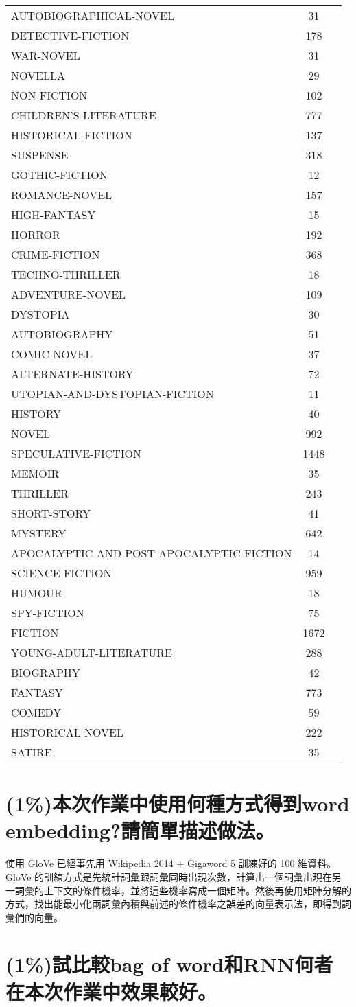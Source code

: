 \documentclass[fleqn,a4paper,12pt]{article}
\begin{document}
\begin{tabular}{| l | c | r |}
  AUTOBIOGRAPHICAL-NOVEL & 31 \\
  DETECTIVE-FICTION & 178 \\
  WAR-NOVEL & 31 \\
  NOVELLA & 29 \\
  NON-FICTION & 102 \\
  CHILDREN'S-LITERATURE & 777 \\
  HISTORICAL-FICTION & 137 \\
  SUSPENSE & 318 \\
  GOTHIC-FICTION & 12 \\
  ROMANCE-NOVEL & 157 \\
  HIGH-FANTASY & 15 \\
  HORROR & 192 \\
  CRIME-FICTION & 368 \\
  TECHNO-THRILLER & 18 \\
  ADVENTURE-NOVEL & 109 \\
  DYSTOPIA & 30 \\
  AUTOBIOGRAPHY & 51 \\
  COMIC-NOVEL & 37 \\
  ALTERNATE-HISTORY & 72 \\
  UTOPIAN-AND-DYSTOPIAN-FICTION & 11 \\
  HISTORY & 40 \\
  NOVEL & 992 \\
  SPECULATIVE-FICTION & 1448 \\
  MEMOIR & 35 \\
  THRILLER & 243 \\
  SHORT-STORY & 41 \\
  MYSTERY & 642 \\
  APOCALYPTIC-AND-POST-APOCALYPTIC-FICTION & 14 \\
  SCIENCE-FICTION & 959 \\
  HUMOUR & 18 \\
  SPY-FICTION & 75 \\
  FICTION & 1672 \\
  YOUNG-ADULT-LITERATURE & 288 \\
  BIOGRAPHY & 42 \\
  FANTASY & 773 \\
  COMEDY & 59 \\
  HISTORICAL-NOVEL & 222 \\
  SATIRE & 35 \\
\end{tabular}

\section{(1\%)本次作業中使用何種方式得到word embedding?請簡單描述做法。}

使用 GloVe 已經事先用 Wikipedia 2014 + Gigaword 5 訓練好的 100 維資料。 GloVe 的訓練方式是先統計詞彙跟詞彙同時出現次數，計算出一個詞彙出現在另一詞彙的上下文的條件機率，並將這些機率寫成一個矩陣。然後再使用矩陣分解的方式，找出能最小化兩詞彙內積與前述的條件機率之誤差的向量表示法，即得到詞彙們的向量。

\section{(1\%)試比較bag of word和RNN何者在本次作業中效果較好。}
\end{document}
